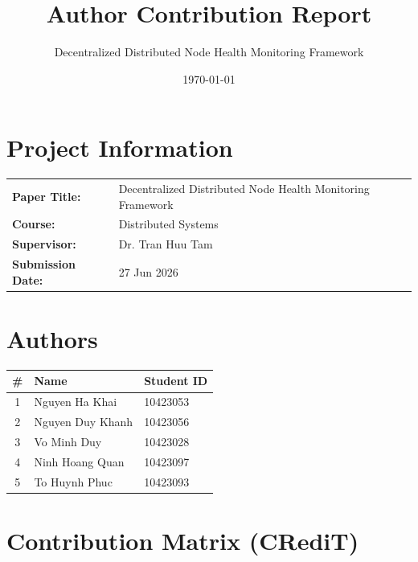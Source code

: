 \documentclass[11pt,a4paper]{article}
\title{\textbf{Author Contribution Report}}
\author{Decentralized Distributed Node Health Monitoring Framework}
\date{\today}
\begin{document}
\maketitle

\section{Project Information}

\begin{tabular}{ll}
\textbf{Paper Title:} & Decentralized Distributed Node Health Monitoring Framework\\
\textbf{Course:} & Distributed Systems \\
\textbf{Supervisor:} & Dr. Tran Huu Tam \\
\textbf{Submission Date:} & 27 Jun 2026\\
\end{tabular}

\vspace{0.5cm}

\section{Authors}

\begin{center}
\begin{tabular}{cll}
\toprule
\textbf{\#} & \textbf{Name} & \textbf{Student ID} \\
\midrule
1 & Nguyen Ha Khai & 10423053 \\
2 & Nguyen Duy Khanh & 10423056 \\
3 & Vo Minh Duy & 10423028 \\
4 & Ninh Hoang Quan & 10423097 \\
5 & To Huynh Phuc & 10423093 \\
\bottomrule
\end{tabular}
\end{center}

\section{Contribution Matrix (CRediT)}
\end{document}
